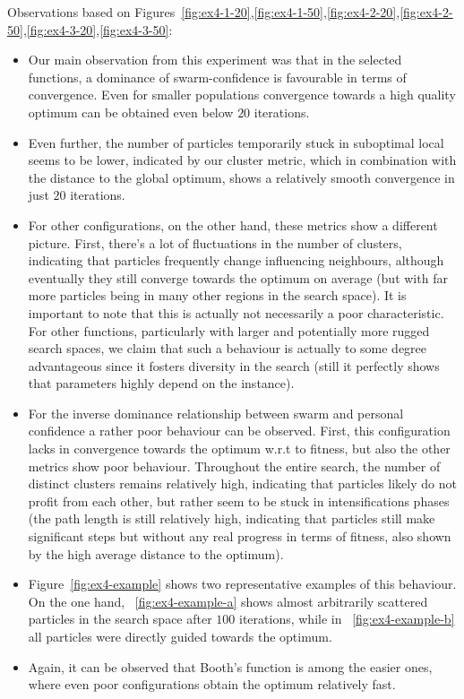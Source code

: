 \documentclass[12pt]{article}
\begin{document}
Observations based on Figures~\ref{fig:ex4-1-20},\ref{fig:ex4-1-50},\ref{fig:ex4-2-20},\ref{fig:ex4-2-50},\ref{fig:ex4-3-20},\ref{fig:ex4-3-50}:
\begin{itemize}
	\item Our main observation from this experiment was that in the selected functions, a dominance of swarm-confidence is favourable in terms of convergence. 
	Even for smaller populations convergence towards a high quality optimum can be obtained even below $20$ iterations.
	\item Even further, the number of particles temporarily stuck in suboptimal local seems to be lower, indicated by our cluster metric, which in combination with the distance to the global optimum, shows a relatively smooth convergence in just $20$ iterations. 
	\item For other configurations, on the other hand, these metrics show a different picture. 
	First, there's a lot of fluctuations in the number of clusters, indicating that particles frequently change influencing neighbours, although eventually they still converge towards the optimum on average (but with far more particles being in many other regions in the search space). 
	It is important to note that this is actually not necessarily a poor characteristic. 
	For other functions, particularly with larger and potentially more rugged search spaces, we claim that such a behaviour is actually to some degree advantageous since it fosters diversity in the search (still it perfectly shows that parameters highly depend on the instance).
	\item For the inverse dominance relationship between swarm and personal confidence a rather poor behaviour can be observed. 
	First, this configuration lacks in convergence towards the optimum w.r.t to fitness, but also the other metrics show poor behaviour. 
	Throughout the entire search, the number of distinct clusters remains relatively high, indicating that particles likely do not profit from each other, but rather seem to be stuck in intensifications phases (the path length is still relatively high, indicating that particles still make significant steps but without any real progress in terms of fitness, also shown by the high average distance to the optimum). 
	\item Figure~\ref{fig:ex4-example} shows two representative examples of this behaviour. 
	On the one hand, ~\ref{fig:ex4-example-a} shows almost arbitrarily scattered particles in the search space after $100$ iterations, while in ~\ref{fig:ex4-example-b} all particles were directly guided towards the optimum. 
	\item Again, it can be observed that Booth's function is among the easier ones, where even poor configurations obtain the optimum relatively fast. 
\end{itemize}
\end{document}
